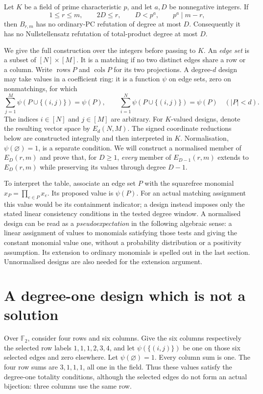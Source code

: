 \begin{lemma}\label{tx:lem:rectangle-obstruction}
Let $K$ be a field of prime characteristic $p$, and let $a,D$ be
nonnegative integers.  If
\[
 1\leq r\leq m,\qquad 2D\leq r,\qquad D<p^a,
 \qquad p^a\mid m-r,
\]
then $B_{r,m}$ has no ordinary-PC refutation of degree at most $D$.
Consequently it has no Nullstellensatz refutation of total-product degree
at most $D$.
\end{lemma}

We give the full construction over the integers before passing to $K$.
An \emph{edge set} is a subset of $[N]\times[M]$.  It is a matching if
no two distinct edges share a row or a column.  Write $\operatorname{rows}P$
and $\operatorname{cols}P$ for its two projections.  A degree-$d$ design
may take values in a coefficient ring: it is a function $\psi$ on edge
sets, zero on nonmatchings, for which
\begin{equation}\label{tx:eq:matching-design}
 \sum_{j=1}^{M}\psi(P\cup\{(i,j)\})=\psi(P),\qquad
 \sum_{i=1}^{N}\psi(P\cup\{(i,j)\})=\psi(P)
 \quad(|P|<d).
\end{equation}
The indices $i\in[N]$ and $j\in[M]$ are arbitrary. For $K$-valued
designs, denote the resulting vector space by $E_d(N,M)$. The signed
coordinate reductions below are constructed integrally and then
interpreted in $K$.  Normalisation, $\psi(\varnothing)=1$, is a separate
condition.  We will construct a normalised member of $E_D(r,m)$ and prove
that, for $D\ge1$, \emph{every} member of $E_{D-1}(r,m)$ extends to $E_D(r,m)$ while
preserving its values through degree $D-1$.

To interpret the table, associate an edge set $P$ with the squarefree
monomial $x_P=\prod_{e\in P}x_e$. Its proposed value is $\psi(P)$.
For an actual matching assignment this value would be its containment
indicator; a design instead imposes only the stated linear consistency
conditions in the tested degree window. A normalised design can be read
as a \emph{pseudoexpectation} in the following algebraic sense: a linear
assignment of values to monomials satisfying those tests and giving the
constant monomial value one, without a probability distribution or a
positivity assumption. Its extension to ordinary monomials is spelled
out in the last section. Unnormalised designs are also needed for the
extension argument.

\section{A degree-one design which is not a solution}
Over $\mathbb F_2$, consider four rows and six columns. Give the six
columns respectively the selected row labels $1,1,1,2,3,4$, and let
$\psi(\{(i,j)\})$ be one on those six selected edges and zero elsewhere.
Let $\psi(\varnothing)=1$. Every column sum is one. The four row
sums are $3,1,1,1$, all one in the field. Thus these values satisfy the
degree-one totality conditions, although the selected edges do not form
an actual bijection: three columns use the same row.

